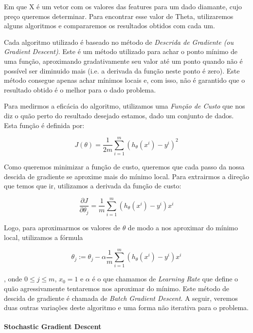 \documentclass[conference]{IEEEtran}
\begin{document}
Em que X é um vetor com os valores das features para um dado diamante, cujo preço queremos determinar. Para encontrar esse valor de Theta, utilizaremos alguns algoritmos e compararemos os resultados obtidos com cada um.

Cada algoritmo utilizado é baseado no método de \textit{Descrida de Gradiente (ou Gradient Descent)}. Este é um método utilizado para achar o ponto mínimo de uma função, aproximando gradativamente seu valor até um ponto quando não é possível ser diminuido mais (i.e. a derivada da função neste ponto é zero). Este método consegue apenas achar mínimos locais e, com isso, não é garantido que o resultado obtido é o melhor para o dado problema.

Para medirmos a eficácia do algoritmo, utilizamos uma \textit{Função de Custo} que nos diz o quão perto do resultado desejado estamos, dado um conjunto de dados. Esta função é definida por:

\begin{equation} \label{eq:cost_function}
J(\theta) = \dfrac{1}{2m} \sum_{i=1}^{m}(h_{\theta}(x^{i}) - y^{i})^2
\end{equation}

Como queremos minimizar a função de custo, queremos que cada passo da nossa descida de gradiente se aproxime mais do mínimo local. Para extrairmos a direção que temos que ir, utilizamos a derivada da função de custo:

\begin{equation} \label{eq:cost_derivative}
\dfrac{\partial J}{\partial \theta_{j}} = \dfrac{1}{m} \sum_{i=1}^{m}(h_{\theta}(x^{i}) - y^{i}) x^{i}
\end{equation}

Logo, para aproximarmos os valores de $\theta$ de modo a nos aproximar do mínimo local, utilizamos a fórmula

\begin{equation} \label{eq:gradient_descent}
\theta_{j} := \theta_{j} - \alpha \dfrac{1}{m} \sum_{i=1}^{m}(h_{\theta}(x^{i}) - y^{i}) x^{i}
\end{equation}

, onde $0 \leq j \leq m$, $x_{0} = 1$ e $\alpha$ é o que chamamos de \textit{Learning Rate} que define o quão agressivamente tentaremos nos aproximar do mínimo. Este método de descida de gradiente é chamada de \textit{Batch Gradient Descent}. A seguir, veremos duas outras variações deste algoritmo e uma forma não iterativa para o problema.

\paragraph{Stochastic Gradient Descent}
\end{document}
